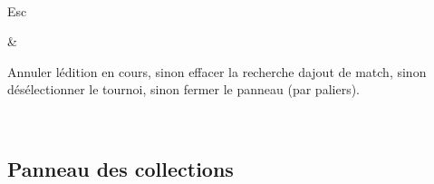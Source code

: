\documentclass[letterpaper,10pt,dvipdfmx]{sphinxmanual}
\begin{document}
\begin{savenotes}
\begin{tabular}[t]{}
\\
\sphinxhline\begin{varwidth}[t]{}
\sphinxAtStartPar
Esc
\sphinxbeforeendvarwidth
\end{varwidth}%
&\begin{varwidth}[t]{}
\sphinxAtStartPar
Annuler l\textquotesingle{}édition en cours, sinon effacer la recherche d\textquotesingle{}ajout de match, sinon désélectionner le tournoi, sinon fermer le panneau (par paliers).
\sphinxbeforeendvarwidth
\end{varwidth}%
\\
\sphinxbottomrule
\end{tabular}
\sphinxtableafterendhook\par
\sphinxattableend\end{savenotes}


\subsection{Panneau des collections}
\label{\detokenize{raccourcis:panneau-des-collections}}\label{\detokenize{raccourcis:raccourcis-collection-panel}}
\end{document}
